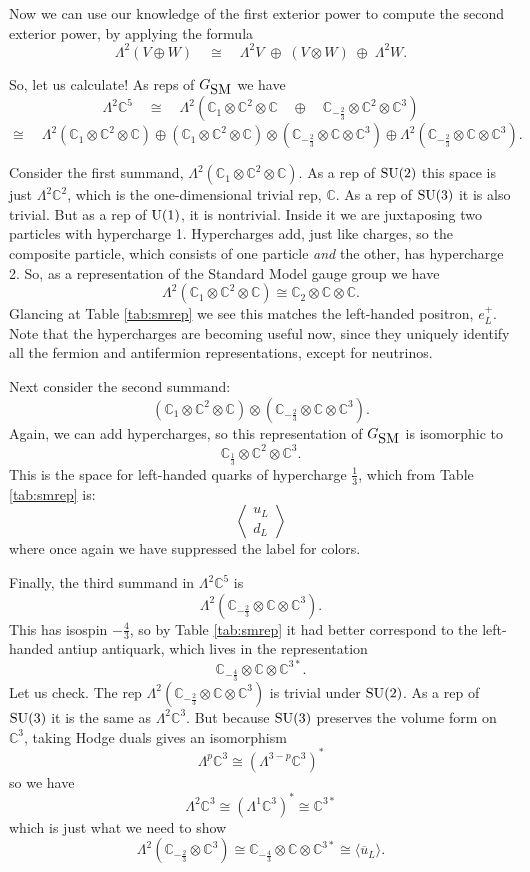 \documentclass[12pt]{article}
\newcommand{\C}{{\mathbb C}}  %
\newcommand{\U}{{\rm U}}    %
\newcommand{\SU}{{\rm SU}}    %
\newcommand{\Ex}{\Lambda} %
\newcommand{\iso}{\cong} %
\newcommand{\third}{\frac{1}{3}} %
\newcommand{\twothirds}{\frac{2}{3}} %
\newcommand{\fourthirds}{\frac{4}{3}} %
\newcommand{\GSM}{{G_{\mbox{\rm SM}}}}  %
\newcommand{\ubar}{\overline{u}} %
\newcommand{\angquark}{\left\langle \! \begin{array}{c} u_L \\ d_L \end{array} \! \right\rangle} %
\begin{document}
Now we can use our knowledge of the first exterior power to
compute the second exterior power, by applying the formula
\[ \Ex^2 (V \oplus W) \quad \iso \quad 
\Ex^2 V \; \oplus \; (V \otimes W) \; \oplus \; \Ex^2 W. \]

So, let us calculate!   As reps of $\GSM$ we have
\[  
\Ex^2 \C^5   \quad \iso \quad
\Ex^2 ( \C_1 \otimes \C^2 \otimes \C \quad 
\oplus \quad \C_{-\twothirds} \otimes \C^2 \otimes \C^3 )  
\]
\[
 \iso  \quad
\Ex^2 ( \C_1 \otimes \C^2 \otimes \C )  \oplus 
      (\C_1 \otimes \C^2 \otimes \C) \otimes 
(\C_{-\twothirds} \otimes \C \otimes \C^3)  \oplus 
     \Ex^2 ( \C_{-\twothirds} \otimes \C \otimes \C^3 ).
\]

Consider the first summand, $\Ex^2 ( \C_1 \otimes
\C^2 \otimes \C)$.  As a rep of $\SU(2)$ this space is just $\Ex^2 \C^2$, 
which is the one-dimensional trivial rep, $\C$. 
As a rep of $\SU(3)$ it is also trivial.  But as a rep of
$\U(1)$, it is nontrivial.  Inside it we are juxtaposing 
two particles with hypercharge 1. Hypercharges add, just like charges, 
so the composite particle, which consists of one particle \emph{and} 
the other, has hypercharge 2.  So, as a representation of the Standard
Model gauge group we have
\[ \Ex^2 (\C_1 \otimes \C^2 \otimes \C) \iso \C_2 \otimes \C \otimes \C  .\]
Glancing at Table \ref{tab:smrep} we see this matches the
left-handed positron, $e^+_L$.  Note that the hypercharges are becoming 
useful now, since they uniquely identify all the fermion and antifermion 
representations, except for neutrinos.

Next consider the second summand:
\[  (\C_1 \otimes \C^2 \otimes \C) \otimes
(\C_{-\twothirds} \otimes \C \otimes \C^3) . \]
Again, we can add hypercharges, so this representation of $\GSM$ is 
isomorphic to
\[ \C_\third \otimes \C^2 \otimes \C^3. \]
This is the space for left-handed quarks of hypercharge $\third$, which
from Table \ref{tab:smrep} is:
\[ \angquark \]
where once again we have suppressed the label for colors.

Finally, the third summand in $\Ex^2 \C^5$ is 
\[ \Ex^2 ( \C_{-\twothirds} \otimes \C \otimes \C^3 ) .\]
This has isospin $-\fourthirds$, so by Table \ref{tab:smrep}
it had better correspond to the left-handed antiup
antiquark, which lives in the representation
\[ \C_{-\fourthirds} \otimes \C \otimes \C^{3*}. \]
Let us check. 
The rep $\Ex^2 ( \C_{-\twothirds} \otimes \C \otimes \C^3 )$ 
is trivial under $\SU(2)$.  As a rep of $\SU(3)$ it is the same as $\Ex^2 \C^3$.  
But because $\SU(3)$ preserves the volume form on $\C^3$, taking Hodge duals 
gives an isomorphism 
\[ \Ex^p \C^3 \iso (\Ex^{3 - p} \C^3)^* \]
so we have
\[ \Ex^2 \C^3 \iso (\Ex^1 \C^3)^* \iso \C^{3*} \]
which is just what we need to show
\[ \Ex^2 ( \C_{-\twothirds} \otimes \C^3 ) \iso 
 \C_{-\fourthirds} \otimes \C \otimes \C^{3*} \iso 
\langle \ubar_L \rangle .\]
\end{document}
